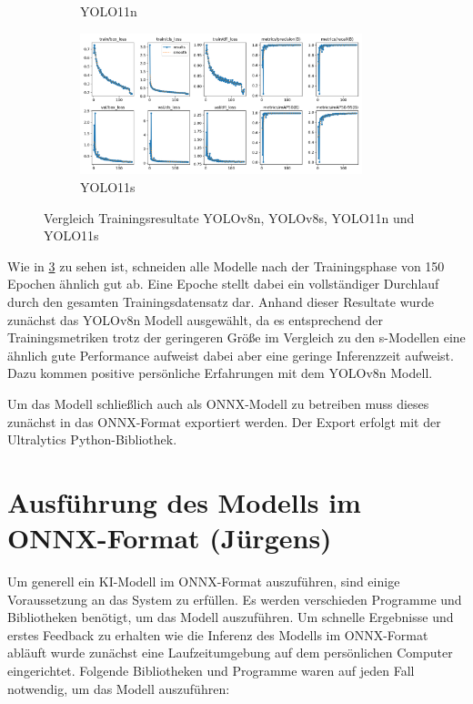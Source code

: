 \begin{figure}[h]
\begin{subfigure}[b]{0.45\textwidth}
    \caption{YOLO11n}
    \label{fig:Trainingsresultate yolo11n}
  \end{subfigure}
  \hfill
  \begin{subfigure}[b]{0.45\textwidth}
    \centering
    \includegraphics[width=0.9\textwidth]{images/Trainingsresults_yolo11s.png}
    \caption{YOLO11s}
    \label{fig:Trainingsresultate yolo11s}
  \end{subfigure}
  \caption{Vergleich Trainingsresultate YOLOv8n, YOLOv8s, YOLO11n und YOLO11s}
  \label{tab:Vergleich Trainingsresultate}
\end{figure}



Wie in \ref{tab:Vergleich Trainingsresultate} zu sehen ist, schneiden alle Modelle nach der Trainingsphase von 150 Epochen ähnlich gut ab. Eine Epoche stellt dabei ein vollständiger Durchlauf durch den gesamten Trainingsdatensatz dar.\cite{EpochGlossary} Anhand dieser Resultate wurde zunächst das YOLOv8n Modell ausgewählt, da es entsprechend der Trainingsmetriken trotz der geringeren Größe im Vergleich zu den s-Modellen eine ähnlich gute Performance aufweist dabei aber eine geringe Inferenzzeit aufweist. Dazu kommen positive persönliche Erfahrungen mit dem YOLOv8n Modell. 


Um das Modell schließlich auch als ONNX-Modell zu betreiben muss dieses zunächst in das ONNX-Format exportiert werden. Der Export erfolgt mit der Ultralytics Python-Bibliothek.

\section{Ausführung des Modells im ONNX-Format (Jürgens)}
Um generell ein KI-Modell im ONNX-Format auszuführen, sind einige Voraussetzung an das System zu erfüllen. Es werden verschieden Programme und Bibliotheken benötigt, um das Modell auszuführen. Um schnelle Ergebnisse und erstes Feedback zu erhalten wie die Inferenz des Modells im ONNX-Format abläuft wurde zunächst eine Laufzeitumgebung auf dem persönlichen Computer eingerichtet. Folgende Bibliotheken und Programme waren auf jeden Fall notwendig, um das Modell auszuführen:

